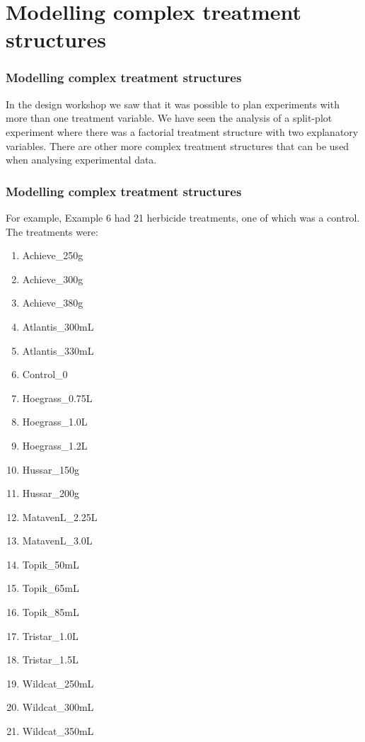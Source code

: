 \section{Modelling complex treatment structures}
\begin{frame}\frametitle{Modelling complex treatment structures}

In the design workshop we saw that it was possible to plan experiments with more than one treatment variable. We have
seen the analysis of a split-plot experiment where there was a factorial treatment structure with two explanatory
variables. There are other more complex treatment structures that can be used when analysing experimental data.

\end{frame}


\begin{frame}\frametitle{Modelling complex treatment structures}
For example, Example 6 had 21 herbicide treatments, one of which was a control. The treatments were:
\begin{multicols}{2}
\begin{enumerate}
\item  Achieve\_250g
\item  Achieve\_300g
\item  Achieve\_380g
\item  Atlantis\_300mL
\item  Atlantis\_330mL
\item  Control\_0
\item  Hoegrass\_0.75L
\item  Hoegrass\_1.0L
\item  Hoegrass\_1.2L
\item  Hussar\_150g
\item  Hussar\_200g
\item  MatavenL\_2.25L
\item  MatavenL\_3.0L
\item  Topik\_50mL
\item  Topik\_65mL
\item  Topik\_85mL
\item  Tristar\_1.0L
\item  Tristar\_1.5L
\item  Wildcat\_250mL
\item  Wildcat\_300mL
\item  Wildcat\_350mL
\end{enumerate}
\end{multicols}
\end{frame}


